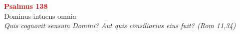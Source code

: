 


\def\greinitialformat#1{%
{\fontsize{39}{39}\selectfont #1}%
}




\vspace{0.3cm}
\begin{center}
 \textcolor{red}{\large \bf Psalmus 138}\\
Dominus intuens omnia\\
\textit{\small Quis cognovit sensum Domini? Aut quis consiliarius eius fuit? (Rom 11,34)}
\end{center}
